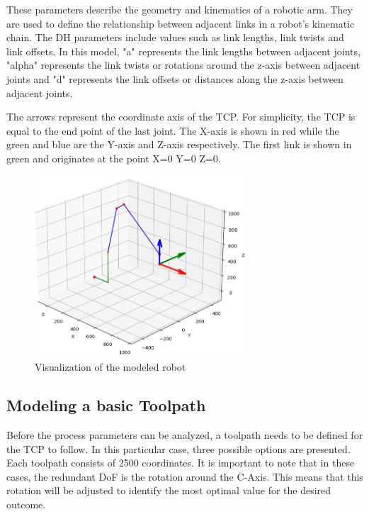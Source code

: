 These parameters describe the geometry and kinematics of a robotic arm. They are used to define the relationship between adjacent links in a robot's kinematic chain. The DH parameters include values such as link lengths, link twists and link offsets. In this model, "a" represents the link lengths between adjacent joints, "alpha" represents the link twists or rotations around the z-axis between adjacent joints and "d" represents the link offsets or distances along the z-axis between adjacent joints. 

The arrows represent the coordinate axis of the TCP. For simplicity, the TCP is equal to the end point of the last joint. The X-axis is shown in red while the green and blue are the Y-axis and Z-axis respectively. The first link is shown in green and originates at the point X=0 Y=0 Z=0.

 \begin{figure}[H]
	\centerline{\includegraphics[width=0.7\textwidth]{figures/robotprog.png}}
	\caption{Visualization of the modeled robot}
	\label{robotprog}
\end{figure}

\subsection{Modeling a basic Toolpath}
Before the process parameters can be analyzed, a toolpath needs to be defined for the TCP to follow. In this particular case, three possible options are presented. Each toolpath consists of 2500 coordinates. It is important to note that in these cases, the redundant DoF is the rotation around the C-Axis. This means that  this rotation will be adjusted to identify the most optimal value for the desired outcome.


